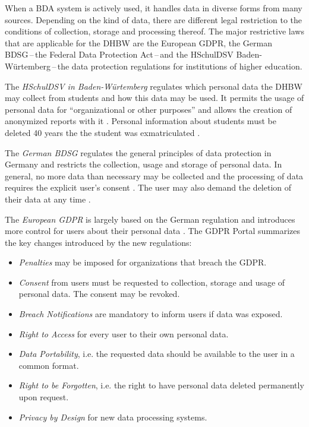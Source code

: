 When a \ac{BDA} system is actively used, it handles data in diverse forms from many sources. Depending on the kind of data, there are different legal restriction to the conditions of collection, storage and processing thereof. The major restrictive laws that are applicable for the \ac{DHBW} are the European \ac{GDPR}, the German \ac{BDSG}\,--\,the Federal Data Protection Act\,--\,and the \ac{HSchulDSV} Baden-Würtemberg\,--\,the data protection regulations for institutions of higher education.

The \emph{\ac{HSchulDSV} in Baden-Würtemberg} regulates which personal data the \ac{DHBW} may collect from students and how this data may be used. It permits the usage of personal data for \enquote{organizational or other purposes} and allows the creation of anonymized reports with it \autocite[§1, §11, §12]{bw2012hcchuldsv}. Personal information about students must be deleted 40 years the the student was exmatriculated \autocite[§1, §11, §12]{bw2012hcchuldsv}.

The \emph{German \ac{BDSG}} regulates the general principles of data protection in Germany and restricts the collection, usage and storage of personal data. In general, no more data than necessary may be collected and the processing of data requires the explicit user's consent \autocite[§1ff.]{bmjv2009bdsg}. The user may also demand the deletion of their data at any time \autocite[§12ff.]{bmjv2009bdsg}.

The \emph{European \ac{GDPR}} is largely based on the German regulation and introduces more control for users about their personal data \autocite{eu2016gdpr}. The \ac{GDPR} Portal \autocite{trunomi2018gdpr} summarizes the key changes introduced by the new regulations:
\begin{itemize}
    \item \emph{Penalties} may be imposed for organizations that breach the \ac{GDPR}.
    \item \emph{Consent} from users must be requested to collection, storage and usage of personal data. The consent may be revoked.
    \item \emph{Breach Notifications} are mandatory to inform users if data was exposed.
    \item \emph{Right to Access} for every user to their own personal data.
    \item \emph{Data Portability}, i.e. the requested data should be available to the user in a common format.
    \item \emph{Right to be Forgotten}, i.e. the right to have personal data deleted permanently upon request.
    \item \emph{Privacy by Design} for new data processing systems.
\end{itemize}

